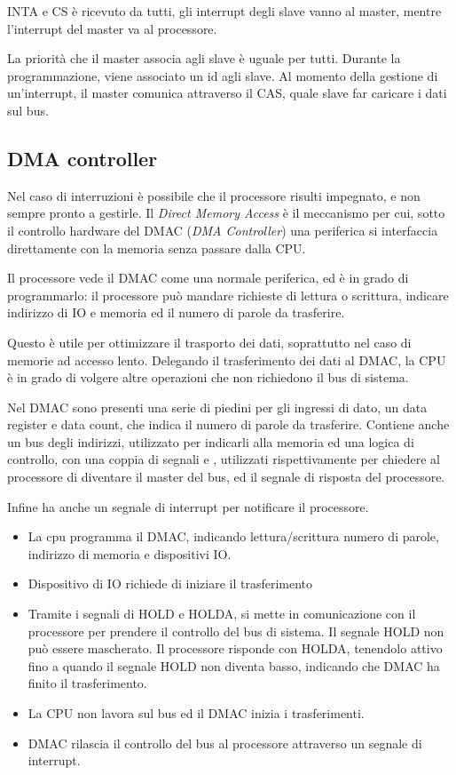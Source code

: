 \documentclass[../template]{subfiles}
\begin{document}
INTA e CS è ricevuto da tutti, gli interrupt degli slave vanno al master, mentre l'interrupt del master va al processore.

La priorità che il master associa agli slave è uguale per tutti.
Durante la programmazione, viene associato un id agli slave. Al momento della gestione di un'interrupt, il master comunica attraverso il CAS, quale slave far caricare i dati sul bus.

\subsection{DMA controller}
Nel caso di interruzioni è possibile che il processore risulti impegnato, e non sempre pronto a gestirle.
Il \textit{Direct Memory Access} è il meccanismo per cui, sotto il controllo hardware del DMAC (\textit{DMA Controller}) una periferica si interfaccia direttamente con la memoria senza passare dalla CPU.

Il processore vede il DMAC come una normale periferica, ed è in grado di programmarlo: il processore può mandare richieste di lettura o scrittura, indicare indirizzo di IO e memoria ed il numero di parole da trasferire.

Questo è utile per ottimizzare il trasporto dei dati, soprattutto nel caso di memorie ad accesso lento. Delegando il trasferimento dei dati al DMAC, la CPU è in grado di volgere altre operazioni che non richiedono il bus di sistema.

Nel DMAC sono presenti una serie di piedini per gli ingressi di dato, un data register e data count, che indica il numero di parole da trasferire. Contiene anche un bus degli indirizzi, utilizzato per indicarli alla memoria ed una logica di controllo, con una coppia di segnali  e , utilizzati rispettivamente per chiedere al processore di diventare il master del bus, ed il segnale di risposta del processore.

Infine ha anche un segnale di interrupt per notificare il processore.

\begin{itemize}
    \item La cpu programma il DMAC, indicando lettura/scrittura numero di parole, indirizzo di memoria e dispositivi IO.
    \item Dispositivo di IO richiede di iniziare il trasferimento
    \item Tramite i segnali di HOLD e HOLDA, si mette in comunicazione con il processore per prendere il controllo del bus di sistema.
        Il segnale HOLD non può essere mascherato. Il processore risponde con HOLDA, tenendolo attivo fino a quando il segnale HOLD non diventa basso, indicando che DMAC ha finito il trasferimento.
    \item La CPU non lavora sul bus ed il DMAC inizia i trasferimenti.

    \item DMAC rilascia il controllo del bus al processore attraverso un segnale di interrupt.
\end{itemize}
\end{document}
